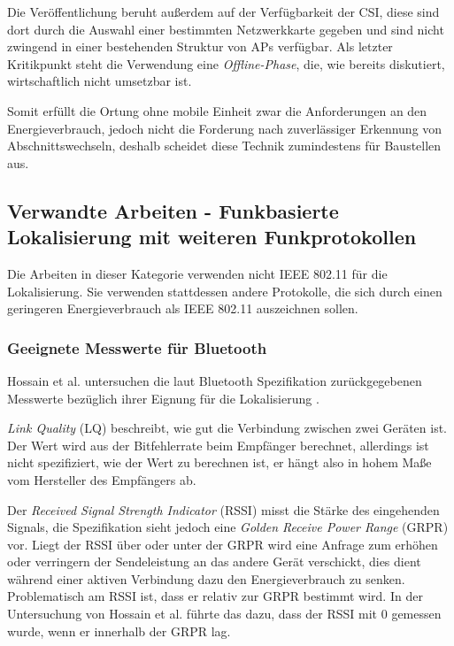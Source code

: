 Die Veröffentlichung beruht außerdem auf der Verfügbarkeit der CSI, diese sind dort durch die Auswahl einer bestimmten Netzwerkkarte gegeben und sind nicht zwingend in einer bestehenden Struktur von APs verfügbar.
Als letzter Kritikpunkt steht die Verwendung eine \emph{Offline-Phase}, die, wie bereits diskutiert, wirtschaftlich nicht umsetzbar ist. 
 
Somit erfüllt die Ortung ohne mobile Einheit zwar die Anforderungen an den Energieverbrauch, jedoch nicht die Forderung nach zuverlässiger Erkennung von Abschnittswechseln, deshalb scheidet diese Technik zumindestens für Baustellen aus.




\subsection{Verwandte Arbeiten - Funkbasierte Lokalisierung mit weiteren Funkprotokollen}
Die Arbeiten in dieser Kategorie verwenden nicht IEEE 802.11 für die Lokalisierung.
Sie verwenden stattdessen andere Protokolle, die sich durch einen geringeren Energieverbrauch als IEEE 802.11 auszeichnen sollen.

\subsubsection{Geeignete Messwerte für Bluetooth}
\label{ch:Vorherige:sec:param}
Hossain et al. untersuchen die laut Bluetooth Spezifikation zurückgegebenen Messwerte bezüglich ihrer Eignung für die Lokalisierung \cite{hossain2007comprehensive}.

\emph{Link Quality} (LQ) beschreibt, wie gut die Verbindung zwischen zwei Geräten ist.
Der Wert wird aus der Bitfehlerrate beim Empfänger berechnet, allerdings ist nicht spezifiziert, wie der Wert zu berechnen ist, er hängt also in hohem Maße vom Hersteller des Empfängers ab. 

Der \emph{Received Signal Strength Indicator} (RSSI) misst die Stärke des eingehenden Signals, die Spezifikation sieht jedoch eine \emph{Golden Receive Power Range} (GRPR) vor. 
Liegt der RSSI über oder unter der GRPR wird eine Anfrage zum erhöhen oder verringern der Sendeleistung an das andere Gerät verschickt, dies dient während einer aktiven Verbindung dazu den Energieverbrauch zu senken.
Problematisch am RSSI ist, dass er relativ zur GRPR bestimmt wird.
In der Untersuchung von Hossain et al. führte das dazu, dass der RSSI mit 0 gemessen wurde, wenn er innerhalb der GRPR lag. 


